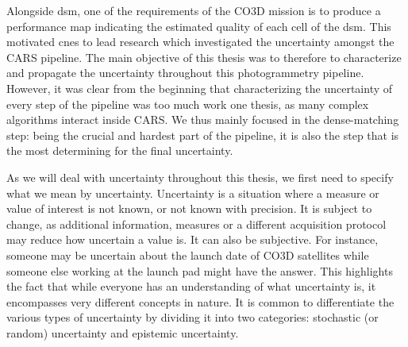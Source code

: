 Alongside \acrshort{dsm}, one of the requirements of the CO3D mission is to produce a performance map indicating the estimated quality of each cell of the \acrshort{dsm}. This motivated \acrshort{cnes} to lead research which investigated the uncertainty amongst the CARS pipeline. The main objective of this thesis was to therefore to characterize and propagate the uncertainty throughout this photogrammetry pipeline. However, it was clear from the beginning that characterizing the uncertainty of every step of the pipeline was too much work one thesis, as many complex algorithms interact inside CARS. We thus mainly focused in the dense-matching step: being the crucial and hardest part of the pipeline, it is also the step that is the most determining for the final uncertainty.

As we will deal with uncertainty throughout this thesis, we first need to specify what we mean by uncertainty. Uncertainty is a situation where a measure or value of interest is not known, or not known with precision. It is subject to change, as additional information, measures or a different acquisition protocol may reduce how uncertain a value is. It can also be subjective. For instance, someone may be uncertain about the launch date of CO3D satellites while someone else working at the launch pad might have the answer. This highlights the fact that while everyone has an understanding of what uncertainty is, it encompasses very different concepts in nature. It is common to differentiate the various types of uncertainty by dividing it into two categories: stochastic (or random) uncertainty and epistemic uncertainty.

